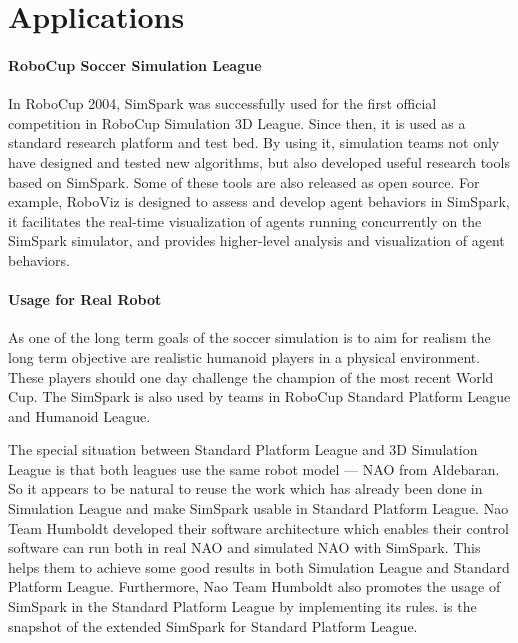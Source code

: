 \documentclass{llncs}
\begin{document}
\section{Applications}

\paragraph{RoboCup Soccer Simulation League}
In RoboCup 2004, SimSpark was successfully used for the first official competition in RoboCup Simulation 3D League. Since then, it is used as a standard research platform and test bed. By using it, simulation teams not only have designed and tested new algorithms, but also developed useful research tools based on SimSpark. Some of these tools are also released as open source.
For example, RoboViz\cite{Stoecker2012} is designed to assess and develop agent behaviors in SimSpark,
it facilitates the real-time visualization of agents running concurrently on the SimSpark simulator,
and provides higher-level analysis and visualization of agent behaviors.

\paragraph{Usage for Real Robot}
As one of the long term goals of the soccer simulation is to aim for realism the long term objective are realistic humanoid players in a physical environment.
These players should one day challenge the champion of the most recent World Cup.
The SimSpark is also used by teams in RoboCup Standard Platform League and Humanoid League.

The special situation between Standard Platform League and 3D Simulation League is that both leagues use the same robot model — NAO from Aldebaran.
So it appears to be natural to reuse the work which has already been done in Simulation League and make SimSpark usable in Standard Platform League.
Nao Team Humboldt developed their software architecture\cite{SCPR2010} which enables their control software can run both in real NAO and simulated NAO with SimSpark. This helps them to achieve some good results in both Simulation League and Standard Platform League.
Furthermore, Nao Team Humboldt also promotes the usage of SimSpark in the Standard Platform League by implementing its rules.  is the snapshot of the extended SimSpark for Standard Platform League.
\end{document}
